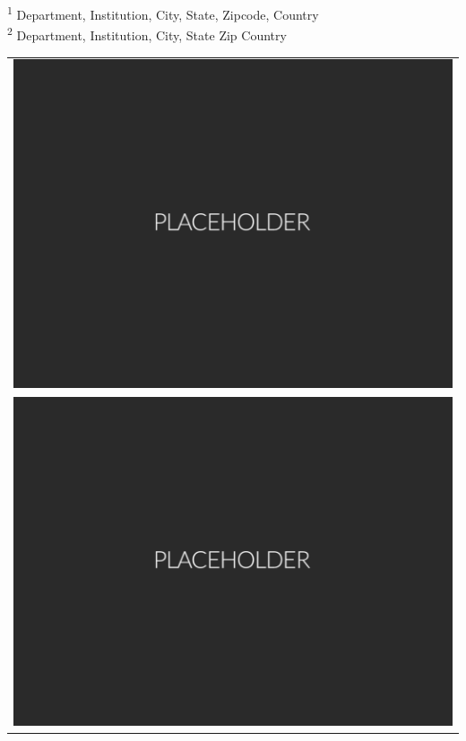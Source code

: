\documentclass[a0paper,portrait]{style/baposter}
\newcommand{\affiliation}{Institution}
\newcommand{\department}{Department}
\newcommand{\affiliationlocation}{City, State, Zipcode, Country}
\begin{document}
\begin{poster}
{  \small{\textsuperscript{1} \department, \affiliation, \affiliationlocation \\[-0.2em]
         \textsuperscript{2} Department, Institution, City, State Zip Country \\[-0.2em]}
}
{
  \begin{tabular}{c}
  \includegraphics[height=0.4\headerheight]{fig/placeholder.pdf} \\
  \includegraphics[height=0.4\headerheight]{fig/placeholder.pdf}
  \end{tabular}
}


\begin{posterbox}[name=blah, column=0, span=3, headerColorOne=aaublue3, borderColor=aaublue3, boxColorOne=aaublue3, boxheaderheight=-1em]{}
\vspace{-2.5ex}
\textcolor{aaublue2}{\noindent\makebox[\linewidth]{\rule{60cm}{1pt}}}
\end{posterbox}


\end{poster}
\end{document}
